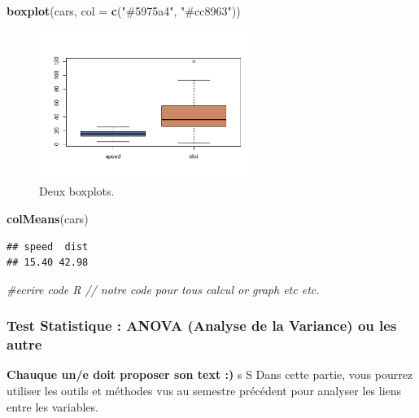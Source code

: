 \documentclass[mstat,12pt]{unswthesis}
\newenvironment{Shaded}{\begin{snugshade}}{\end{snugshade}}
\newcommand{\AttributeTok}[1]{\textcolor[rgb]{0.13,0.29,0.53}{#1}}
\newcommand{\CommentTok}[1]{\textcolor[rgb]{0.56,0.35,0.01}{\textit{#1}}}
\newcommand{\FunctionTok}[1]{\textcolor[rgb]{0.13,0.29,0.53}{\textbf{#1}}}
\newcommand{\NormalTok}[1]{#1}
\newcommand{\StringTok}[1]{\textcolor[rgb]{0.31,0.60,0.02}{#1}}
\begin{document}
\begin{Shaded}
\begin{Highlighting}[]
\FunctionTok{boxplot}\NormalTok{(cars, }\AttributeTok{col =} \FunctionTok{c}\NormalTok{(}\StringTok{"\#5975a4"}\NormalTok{, }\StringTok{"\#cc8963"}\NormalTok{))}
\end{Highlighting}
\end{Shaded}

\begin{figure}

{\centering \includegraphics[width=7cm]{scdon2-UPV-report-template_sansPython_files/figure-latex/unnamed-chunk-5-1} 

}

\caption{\label{fig:boxplots}Deux boxplots.}\label{fig:unnamed-chunk-5}
\end{figure}

\begin{Shaded}
\begin{Highlighting}[]
\FunctionTok{colMeans}\NormalTok{(cars)}
\end{Highlighting}
\end{Shaded}

\begin{verbatim}
## speed  dist 
## 15.40 42.98
\end{verbatim}

\begin{Shaded}
\begin{Highlighting}[]
 \CommentTok{\#ecrire code R // notre code pour tous calcul or graph etc etc. }
\end{Highlighting}
\end{Shaded}

\subsubsection{Test Statistique : ANOVA (Analyse de la Variance) ou les
autre}\label{test-statistique-anova-analyse-de-la-variance-ou-les-autre-1}

\textbf{Chauque un/e doit proposer son text :) }s S Dans cette partie,
vous pourrez utiliser les outils et méthodes vus au semestre précédent
pour analyser les liens entre les variables.
\end{document}
